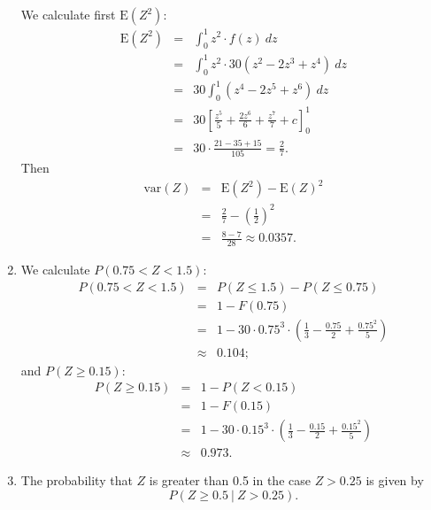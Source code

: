 \documentclass[12pt,thmsa]{article}
\begin{document}
\begin{enumerate}
We calculate first $\text{E}(Z^2)$:
  \begin{eqnarray*}
     \text{E}(Z^2) &=& \int_0^1 z^2 \cdot f(z) \ dz \\
    &=& \int_0^1 z^2 \cdot 30(z^2 - 2z^3 + z^4) \ dz \\
    &=& 30 \int_0^1 (z^4-2z^5+z^6) \ dz \\
    &=& 30 \left[ \frac{z^5}{5} + \frac{2z^6}{6} + \frac{z^7}{7} + c 
      \right]_0^1  \\
    &=& 30 \cdot \frac{21-35+15}{105} = \frac{2}{7}.
  \end{eqnarray*}
  Then
  \begin{eqnarray*}
     \text{var}(Z) &=& \text{E}(Z^2)-\text{E}(Z)^2 \\
    &=& \frac{2}{7} - \left( \frac{1}{2} \right)^2 \\
    &=& \frac{8-7}{28} \approx {0.0357}.
  \end{eqnarray*}
  
\item We calculate $P(0.75 < Z < 1.5)$:
  \begin{eqnarray*}
    P(0.75 < Z < 1.5) &=& P(Z \le 1.5) -P(Z \le 0.75) \\
    &=& 1 - F(0.75) \\
    &=& 1 - 30 \cdot 0.75^3 \cdot \left( \frac{1}{3} - \frac{0.75}{2} +
      \frac{0.75^2}{5} \right) \\
    &\approx& {0.104};
  \end{eqnarray*}
   and $P(Z \ge 0.15)$:
   \begin{eqnarray*}
     P(Z \ge 0.15) &=& 1-P(Z < 0.15) \\
     &=& 1-F(0.15) \\
     &=& 1- 30 \cdot 0.15^3 \cdot \left( \frac{1}{3} - \frac{0.15}{2} +
      \frac{0.15^2}{5} \right) \\
    &\approx& {0.973}.
   \end{eqnarray*}
% 
% 
 \item The probability that $Z$ is greater than 0.5 in the case $Z > 0.25$
  is given by 
$$P ( Z \ge 0.5 \ | \ Z > 0.25).$$ 


\end{enumerate}
\end{document}
